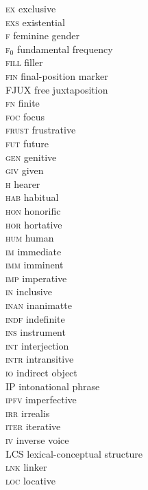 \begin{multicols}{2}
\begin{tabbing}
 \textsc{ex}  \> exclusive \\
 \textsc{exs}  \> existential \\
 \textsc{f}  \> feminine gender \\
 \textsc{f$_0$} \> fundamental frequency \\
 \textsc{fill}  \> filler \\
 \textsc{fin}  \> final-position marker \\
 \textsc{FJUX}  \> free juxtaposition \\
 \textsc{fn}  \> finite \\
 \textsc{foc}  \> focus \\
 \textsc{frust}  \> frustrative \\
 \textsc{fut}  \> future \\
 \textsc{gen}  \> genitive \\
 \textsc{giv}  \> given \\
 \textsc{h}  \> hearer \\
 \textsc{hab}  \> habitual \\
 \textsc{hon}  \> honorific \\
 \textsc{hor}  \> hortative \\
 \textsc{hum}  \> human \\
 \textsc{im}  \> immediate \\
 \textsc{imm}  \> imminent \\
 \textsc{imp}  \> imperative \\
 \textsc{in}  \> inclusive \\
 \textsc{inan}  \> inanimatte \\
 \textsc{indf}  \> indefinite \\
 \textsc{ins}  \> instrument \\
 \textsc{int}  \> interjection \\
 \textsc{intr}  \> intransitive \\
 \textsc{io}  \> indirect object \\
 \textsc{IP}  \> intonational phrase \\
 \textsc{ipfv}  \> imperfective \\
 \textsc{irr}  \> irrealis \\
 \textsc{iter}  \> iterative \\
 \textsc{iv}  \> inverse voice \\
 \textsc{LCS}  \> lexical-conceptual structure \\
 \textsc{lnk}  \> linker \\
 \textsc{loc}  \> locative \\

\end{tabbing}
\end{multicols}

